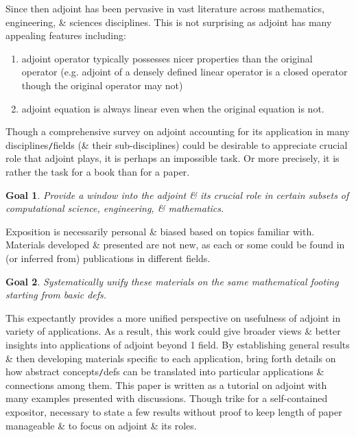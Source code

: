 \documentclass{article}
\newtheorem{goal}{Goal}
\begin{document}
\begin{enumerate}
\begin{itemize}
		Since then adjoint has been pervasive in vast literature across mathematics, engineering, \& sciences disciplines. This is not surprising as adjoint has many appealing features including:
		\begin{enumerate}
			\item adjoint operator typically possesses nicer properties than the original operator (e.g. adjoint of a densely defined linear operator is a closed operator though the original operator may not)
			\item adjoint equation is always linear even when the original equation is not.
		\end{enumerate}
		Though a comprehensive survey on adjoint accounting for its application in many disciplines{\tt/}fields (\& their sub-disciplines) could be desirable to appreciate crucial role that adjoint plays, it is perhaps an impossible task. Or more precisely, it is rather the task for a book than for a paper.
		\begin{goal}
			Provide a window into the adjoint \& its crucial role in certain subsets of computational science, engineering, \& mathematics.
		\end{goal}
		Exposition is necessarily personal \& biased based on topics familiar with. Materials developed \& presented are not new, as each or some could be found in (or inferred from) publications in different fields.
		\begin{goal}
			Systematically unify these materials on the same mathematical footing starting from basic defs.
		\end{goal}
		This expectantly provides a more unified perspective on usefulness of adjoint in variety of applications. As a result, this work could give broader views \& better insights into applications of adjoint beyond 1 field. By establishing general results \& then developing materials specific to each application, bring forth details on how abstract concepts{\tt/}defs can be translated into particular applications \& connections among them. This paper is written as a tutorial on adjoint with many examples presented with discussions. Though trike for a self-contained expositor, necessary to state a few results without proof to keep length of paper manageable \& to focus on adjoint \& its roles.
		

\end{itemize}
\end{enumerate}
\end{document}
